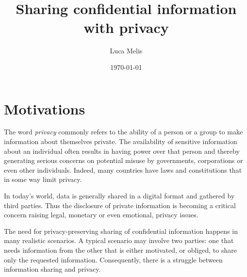 \documentclass[dvips,12pt]{article}
\begin{document}
\title{Sharing confidential information with privacy}
\author{Luca Melis}
\date{\today}



\maketitle
\section{Motivations}
The word \emph{privacy} commonly refers to the ability of a person or a group to make information about themselves private. The availability of sensitive information about an individual often results in having power over that person and thereby generating serious concerns on potential misuse by governments, corporations or even other individuals. Indeed, many countries have laws and constitutions that in some way limit privacy.


In today's world, data is generally shared in a digital format and gathered by third parties.
Thus the disclosure of private information is becoming a critical concern raising legal, monetary or even emotional, privacy issues.
   
The need for privacy-preserving sharing of confidential information happens in many realistic scenarios.
A typical scenario may involve two parties: one that needs information from the other that is either motivated, or obliged, to share only the requested information.
Consequently, there is a struggle between information sharing and privacy.
\end{document}
